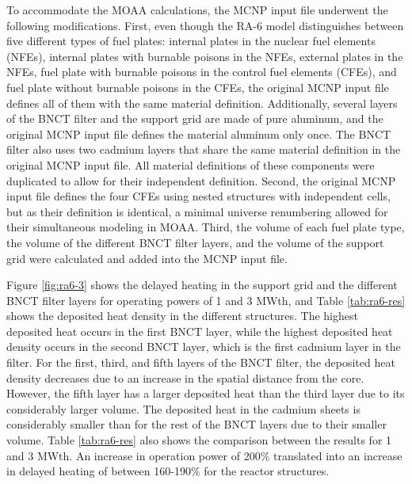 To accommodate the MOAA calculations, the MCNP input file underwent the following modifications.
First, even though the RA-6 model distinguishes between five different types of fuel plates: internal plates in the nuclear fuel elements (NFEs), internal plates with burnable poisons in the NFEs, external plates in the NFEs, fuel plate with burnable poisons in the control fuel elements (CFEs), and fuel plate without burnable poisons in the CFEs, the original MCNP input file defines all of them with the same material definition.
Additionally, several layers of the BNCT filter and the support grid are made of pure aluminum, and the original MCNP input file defines the material aluminum only once.
The BNCT filter also uses two cadmium layers that share the same material definition in the original MCNP input file.
All material definitions of these components were duplicated to allow for their independent definition.
Second, the original MCNP input file defines the four CFEs using nested structures with independent cells, but as their definition is identical, a minimal universe renumbering allowed for their simultaneous modeling in MOAA.
Third, the volume of each fuel plate type, the volume of the different BNCT filter layers, and the volume of the support grid were calculated and added into the MCNP input file.

Figure \ref{fig:ra6-3} shows the delayed heating in the support grid and the different BNCT filter layers for operating powers of 1 and 3 MWth, and Table \ref{tab:ra6-res} shows the deposited heat density in the different structures.
The highest deposited heat occurs in the first BNCT layer, while the highest deposited heat density occurs in the second BNCT layer, which is the first cadmium layer in the filter.
For the first, third, and fifth layers of the BNCT filter, the deposited heat density decreases due to an increase in the spatial distance from the core.
However, the fifth layer has a larger deposited heat than the third layer due to its considerably larger volume.
The deposited heat in the cadmium sheets is considerably smaller than for the rest of the BNCT layers due to their smaller volume.
Table \ref{tab:ra6-res} also shows the comparison between the results for 1 and 3 MWth.
An increase in operation power of 200\% translated into an increase in delayed heating of between 160-190\% for the reactor structures.

